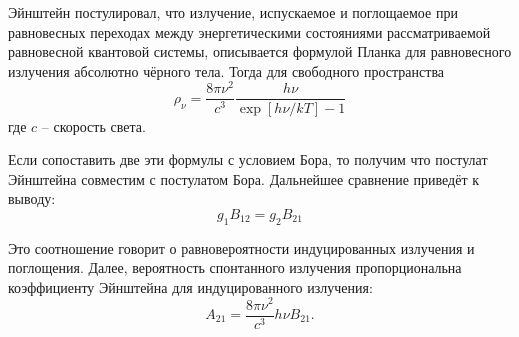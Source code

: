Эйнштейн постулировал, что излучение, испускаемое и поглощаемое при
равновесных переходах между энергетическими состояниями рассматриваемой
равновесной квантовой системы, описывается формулой Планка для
равновесного излучения абсолютно чёрного тела. Тогда для свободного
пространства
\[
    \rho_\nu = \frac{8\pi\nu^2}{c^3}\frac{h\nu}{\exp[h\nu/kT] - 1}
\]
где \( c \) -- скорость света.

Если сопоставить две эти формулы с условием Бора, то получим что
постулат Эйнштейна совместим с постулатом Бора. Дальнейшее сравнение приведёт
к выводу:
\[
    g_1 B_{12} = g_2 B_{21}
\]

Это соотношение говорит о равновероятности индуцированных излучения и
поглощения. Далее, вероятность спонтанного излучения пропорциональна
коэффициенту Эйнштейна для индуцированного излучения:
\[
    A_{21} = \frac{8\pi\nu^2}{c^3}h\nu B_{21}.
\]

